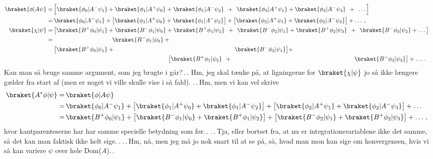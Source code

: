 \documentclass{report}
\begin{document}
\begin{align}
\begin{aligned}
\braket{\phi| A \psi} = &\,
\Big[
\braket{\phi_0 | A^- \psi_1} 
+ \braket{\phi_1 | A^+ \psi_0} 
+ \braket{\phi_1 | A^- \psi_2} 
\:\:+\:\: \braket{\phi_2 | A^+ \psi_1} 
+ \braket{\phi_2 | A^- \psi_3} 
\:\:+\:\: \ldots
\Big]%
\\
=&\,
\braket{\phi_0 | A^- \psi_1} +
\big[
\braket{\phi_1 | A^+ \psi_0} +
\braket{\phi_1 | A^- \psi_2}
\big] + \big[
\braket{\phi_2 | A^+ \psi_1} +
\braket{\phi_2 | A^- \psi_3} 
\big]%
+ \ldots\,,\\
\braket{\chi| \psi} = &\,
\big[
\braket{B^+ \phi_0 | \psi_1} +
\braket{B^- \phi_1 | \psi_0} +
\braket{B^+ \phi_1 | \psi_2} \:\:+\:\:
\braket{B^- \phi_2 | \psi_1} +
\braket{B^+ \phi_2 | \psi_3} \:\:+\:\:
\braket{B^- \phi_3 | \psi_2} +
\ldots
\big]%
\\
= &\,
\phantom{	\big[
	\braket{B^+ \phi_0 | \psi_1} +			}
\braket{B^- \phi_1 | \psi_0} +
\phantom{		\braket{B^+ \phi_1 | \psi_2} +
	\braket{B^- \phi_2 | \psi_1} %
	\big]										}
\\
&\,
\big[
\braket{B^+ \phi_0 | \psi_1} +
\phantom{
	\braket{B^- \phi_1 | \psi_0} +
	\braket{B^+ \phi_1 | \psi_2} \:\:+\:\:	}
\braket{B^- \phi_2 | \psi_1} %
\big]%
+ \\
&\,
\phantom{		\braket{B^+ \phi_0 | \psi_1} +
	\braket{B^- \phi_1 | \psi_0} +			}
\big[
\braket{B^+ \phi_1 | \psi_2} \:\:+\:\:
\phantom{		\braket{B^- \phi_2 | \psi_1} +
	\braket{B^+ \phi_2 | \psi_3} \:\:+\:\:	}
\braket{B^- \phi_3 | \psi_2}
\big]%
+ \ldots\,.
\end{aligned}
\end{align}
Kan man så bruge samme argument, som jeg brugte i går?\,.\,. Hm, jeg skal tænke på, at ligningerne for $\braket{\chi|\psi}$ jo så ikke længere gælder fra start af (men er noget vi ville skulle vise i så fald). .\,.\,Hm, men vi kan vel skrive
\begin{align}
\begin{aligned}
	\braket{A^* \phi | \psi} =&\, \braket{\phi | A \psi} \\
		=&\,
				\braket{\phi_0 | A^- \psi_1} +
			\big[
				\braket{\phi_1 | A^+ \psi_0} +
				\braket{\phi_1 | A^- \psi_2}
			\big] +
			\big[
				\braket{\phi_2 | A^+ \psi_1} +
				\braket{\phi_2 | A^- \psi_3}
			\big] +	\ldots\\
		=&\,
				\braket{B^+ \phi_0 | \psi_1} +
			\big[
				\braket{B^- \phi_1 | \psi_0} +
				\braket{B^+ \phi_1 | \psi_2}
			\big] +
			\big[
				\braket{B^- \phi_2 | \psi_1} +
				\braket{B^+ \phi_2 | \psi_3}
			\big] + \ldots\,,
\end{aligned}
\end{align}
hvor kantparenteserne har har samme specielle betydning som før.\,. .\,.\,Tja, eller bortset fra, at nu er integrationsvariablene ikke det samme, så det kan man faktisk ikke helt sige.\,. .\,.\,Hm, nå, men jeg må jo nok snart til at se på, så, hvad man mon kan sige om konvergensen, hvis vi så kan variere $\psi$ over hele Dom($A$).\,. 
\end{document}
